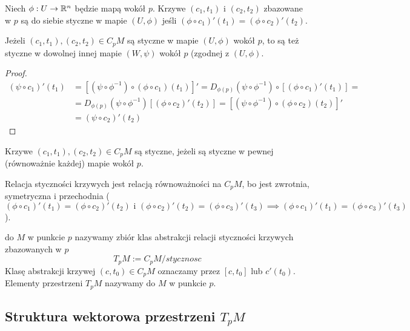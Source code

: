 \begin{definition}
  Niech $\phi:U\to \mathbb{R}^n$ będzie mapą wokół $p$. Krzywe $(c_1,t_1)$ i $(c_2, t_2)$ zbazowane w $p$ są do siebie styczne w mapie $(U,\phi)$ jeśli $(\phi\circ c_1)'(t_1)=(\phi\circ c_2)'(t_2)$.
\end{definition}

\begin{lemma}
  Jeżeli $(c_1,t_1),(c_2,t_2)\in C_pM$ są styczne w mapie $(U,\phi)$ wokół $p$, to są też styczne w dowolnej innej mapie $(W, \psi)$ wokół $p$ (zgodnej z $(U, \phi)$.
\end{lemma}

\begin{proof}
  \begin{align*}
    (\psi\circ c_1)'(t_1)&=[(\psi\circ\phi^{-1})\circ(\phi\circ c_1)(t_1)]'=D_{\phi(p)}(\psi\circ\phi^{-1})\circ [(\phi\circ c_1)'(t_1)]=\\
                         &=D_{\phi(p)}(\psi\circ\phi^{-1})[(\phi\circ c_2)'(t_2)]=[(\psi\circ\phi^{-1})\circ(\phi\circ c_2)(t_2)]'\\
                         &=(\psi\circ c_2)'(t_2)
  \end{align*}
\end{proof}

\begin{definition}
  Krzywe $(c_1,t_1),(c_2,t_2)\in C_pM$ są styczne, jeżeli są styczne w pewnej (równoważnie każdej) mapie wokół $p$.
\end{definition}

Relacja styczności krzywych jest relacją równoważności na $C_pM$, bo jest zwrotnia, symetryczna i przechodnia ($(\phi\circ c_1)'(t_1)=(\phi\circ c_2)'(t_2)\text{ i }(\phi\circ c_2)'(t_2)=(\phi\circ c_3)'(t_3)\implies(\phi\circ c_1)'(t_1)=(\phi\circ c_3)'(t_3)$).

\begin{definition}
   do $M$ w punkcie $p$ nazywamy zbiór klas abstrakcji relacji styczności krzywych zbazowanych w $p$
  $$T_pM:=C_pM/stycznosc$$
  Klasę abstrakcji krzywej $(c, t_0)\in C_pM$ oznaczamy przez $[c, t_0]$ lub $c'(t_0)$. Elementy przestrzeni $T_pM$ nazywamy  do $M$ w punkcie $p$.
\end{definition}

\subsection{Struktura wektorowa przestrzeni $T_pM$}

